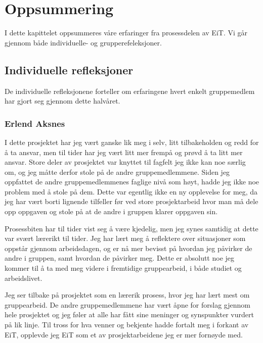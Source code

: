 \chapter{Oppsummering}
I dette kapittelet oppsummeres våre erfaringer fra prosessdelen av EiT.
Vi går gjennom både individuelle- og grupperefeleksjoner.

\section{Individuelle refleksjoner}
\label{individuellerefleksjoner}
De individuelle refleksjonene forteller om erfaringene hvert enkelt gruppemedlem
har gjort seg gjennom dette halvåret.

\subsection*{Erlend Aksnes}
I dette prosjektet har jeg vært ganske lik meg i selv, litt tilbakeholden og redd for å ta ansvar, men til tider har jeg vært litt mer frempå og prøvd å ta litt mer ansvar. Store deler av prosjektet var knyttet til fagfelt jeg ikke kan noe særlig om, og jeg måtte derfor stole på de andre gruppemedlemmene. Siden jeg oppfattet de andre gruppemedlemmenes faglige nivå som høyt, hadde jeg ikke noe problem med å stole på dem. Dette var egentlig ikke en ny opplevelse for meg, da jeg har vært borti lignende tilfeller før ved store prosjektarbeid hvor man må dele opp oppgaven og stole på at de andre i gruppen klarer oppgaven sin. 

Prosessbiten har til tider vist seg å være kjedelig, men jeg synes samtidig at dette var svært lærerikt til tider. Jeg har lært meg å reflektere over situasjoner som oppstår gjennom arbeidsdagen, og er nå mer bevisst på hvordan jeg påvirker de andre i gruppen, samt hvordan de påvirker meg. Dette er absolutt noe jeg kommer til å ta med meg videre i fremtidige gruppearbeid, i både studiet og arbeidslivet.

Jeg ser tilbake på prosjektet som en lærerik prosess, hvor jeg har lært mest om gruppearbeid. De andre gruppemedlemmene har vært åpne for forslag gjennom hele prosjektet og jeg føler at alle har fått sine meninger og synspunkter vurdert på lik linje. Til tross for hva venner og bekjente hadde fortalt meg i forkant av EiT, opplevde jeg EiT som et av prosjektarbeidene jeg er mer fornøyde med. 

